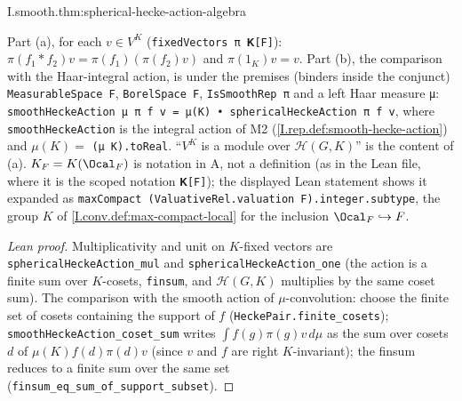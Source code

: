 \begin{tfformal}{I.smooth.thm:spherical-hecke-action-algebra}
\begin{tffidelity}
Part (a), for each $v\in V^K$ (\texttt{fixedVectors π 𝐊[F]}): $\pi(f_1*f_2)v=\pi(f_1)(\pi(f_2)v)$ and $\pi(1_K)v=v$. Part (b), the comparison with the Haar-integral action, is under the premises (binders inside the conjunct) \texttt{MeasurableSpace F}, \texttt{BorelSpace F}, \texttt{IsSmoothRep π} and a left Haar measure \texttt{μ}: \texttt{smoothHeckeAction μ π f v = μ(K) • sphericalHeckeAction π f v}, where \texttt{smoothHeckeAction} is the integral action of M2 (\cref{I.rep.def:smooth-hecke-action}) and $\mu(K)=$ \texttt{(μ K).toReal}. ``$V^K$ is a module over $\mathcal H(G,K)$'' is the content of (a). $K_F=K(\Ocal_F)$ is notation in A, not a definition (as in the Lean file, where it is the scoped notation \texttt{𝐊[F]}); the displayed Lean statement shows it expanded as \texttt{maxCompact (ValuativeRel.valuation F).integer.subtype}, the group $K$ of \cref{I.conv.def:max-compact-local} for the inclusion $\Ocal_F\hookrightarrow F$.
\end{tffidelity}
\end{tfformal}
\begin{proof}[Lean proof]
Multiplicativity and unit on $K$-fixed vectors are \texttt{sphericalHeckeAction\_mul} and \texttt{sphericalHeckeAction\_one} (the action is a finite sum over $K$-cosets, \texttt{finsum}, and $\mathcal H(G,K)$ multiplies by the same coset sum). The comparison with the smooth action of $\mu$-convolution: choose the finite set of cosets containing the support of $f$ (\texttt{HeckePair.finite\_cosets}); \texttt{smoothHeckeAction\_coset\_sum} writes $\int f(g)\pi(g)v\,d\mu$ as the sum over cosets $d$ of $\mu(K)f(d)\pi(d)v$ (since $v$ and $f$ are right $K$-invariant); the finsum reduces to a finite sum over the same set (\texttt{finsum\_eq\_sum\_of\_support\_subset}).
\end{proof}

